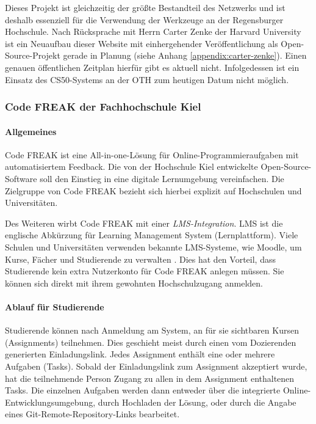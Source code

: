 Dieses Projekt ist gleichzeitig der größte Bestandteil des Netzwerks und ist
deshalb essenziell für die Verwendung der Werkzeuge an der Regensburger
Hochschule. Nach Rücksprache mit Herrn Carter Zenke der Harvard University ist
ein Neuaufbau dieser Website mit einhergehender Veröffentlichung als
Open-Source-Projekt gerade in Planung (siehe Anhang
\ref{appendix:carter-zenke}). Einen genauen öffentlichen Zeitplan hierfür gibt
es aktuell nicht. Infolgedessen ist ein Einsatz des CS50-Systems an der OTH zum
heutigen Datum nicht möglich.

\newpage
\subsubsection{Code FREAK der Fachhochschule Kiel}\label{code-freak}
\paragraph{Allgemeines}
Code FREAK ist eine All-in-one-Lösung für Online-Programmieraufgaben mit
automatisiertem Feedback. Die von der Hochschule Kiel entwickelte
Open-Source-Software soll den Einstieg in eine digitale Lernumgebung
vereinfachen. Die Zielgruppe von Code FREAK bezieht sich hierbei explizit auf
Hochschulen und Universitäten. \parencite{codefreak-startseite}

Des Weiteren wirbt Code FREAK mit einer \emph{LMS-Integration}. LMS ist die
englische Abkürzung für Learning Management System (Lernplattform). Viele
Schulen und Universitäten verwenden bekannte LMS-Systeme, wie Moodle, um Kurse,
Fächer und Studierende zu verwalten \parencite{moodle}. Dies hat den Vorteil,
dass Studierende kein extra Nutzerkonto für Code FREAK anlegen müssen. Sie
können sich direkt mit ihrem gewohnten Hochschulzugang anmelden.

\paragraph{Ablauf für Studierende}
Studierende können nach Anmeldung am System, an für sie sichtbaren Kursen
(Assignments) teilnehmen. Dies geschieht meist durch einen vom Dozierenden
generierten Einladungslink. Jedes Assignment enthält eine oder mehrere Aufgaben
(Tasks). Sobald der Einladungslink zum Assignment akzeptiert wurde, hat die
teilnehmende Person Zugang zu allen in dem Assignment enthaltenen Tasks. Die
einzelnen Aufgaben werden dann entweder über die integrierte
Online-Entwicklungsumgebung, durch Hochladen der Lösung, oder durch die Angabe
eines Git-Remote-Repository-Links bearbeitet.


